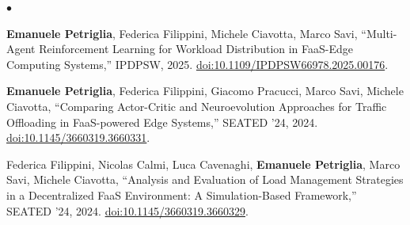 {}

\begin{list}{\scriptsize$\bullet$}{%
	\setlength{\leftmargin}{1em}
	\setlength{\itemsep}{0em}
	\setlength{\topsep}{0em}
	\setlength{\parsep}{0em}
	\setlength{\partopsep}{0em}
}
	\item \textbf{Emanuele Petriglia}, Federica Filippini, Michele Ciavotta, Marco Savi, 
	``Multi-Agent Reinforcement Learning for Workload Distribution in FaaS-Edge Computing Systems,'' IPDPSW, 2025. 
	\href{https://doi.org/10.1109/IPDPSW66978.2025.00176}{doi:10.1109/IPDPSW66978.2025.00176}.
	
	\item \textbf{Emanuele Petriglia}, Federica Filippini, Giacomo Pracucci, Marco Savi, Michele Ciavotta, 
	``Comparing Actor-Critic and Neuroevolution Approaches for Traffic Offloading in FaaS-powered Edge Systems,'' SEATED '24, 2024. \href{https://doi.org/10.1145/3660319.3660331}{doi:10.1145/3660319.3660331}.
	
	\item Federica Filippini, Nicolas Calmi, Luca Cavenaghi, \textbf{Emanuele Petriglia}, Marco Savi, Michele Ciavotta, 
	``Analysis and Evaluation of Load Management Strategies in a Decentralized FaaS Environment: A Simulation-Based Framework,'' 
	SEATED '24, 2024. 
	\href{https://doi.org/10.1145/3660319.3660329}{doi:10.1145/3660319.3660329}.
\end{list}



